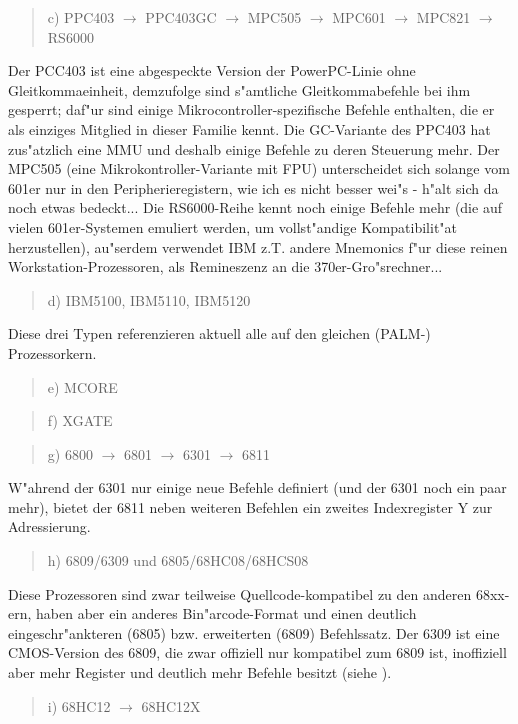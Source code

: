 \documentclass[12pt,a4paper,twoside]{report}
\begin{document}
\begin{quote}
c) PPC403 $\rightarrow$ PPC403GC $\rightarrow$ MPC505 $\rightarrow$ MPC601 $\rightarrow$ MPC821 $\rightarrow$ RS6000
\end{quote}
Der PCC403 ist eine abgespeckte Version der PowerPC-Linie ohne
Gleitkommaeinheit, demzufolge sind s"amtliche Gleitkommabefehle
bei ihm gesperrt; daf"ur sind einige Mikrocontroller-spezifische
Befehle enthalten, die er als einziges Mitglied in dieser Familie
kennt.  Die GC-Variante des PPC403 hat zus"atzlich eine MMU und deshalb
einige Befehle zu deren Steuerung mehr.  Der MPC505 (eine Mikrokontroller-Variante mit FPU)
unterscheidet sich solange vom 601er nur in den Peripherieregistern,
wie ich es nicht besser wei"s - \cite{Mot505} h"alt sich da noch etwas bedeckt...
Die RS6000-Reihe kennt noch einige Befehle mehr (die auf vielen
601er-Systemen emuliert werden, um vollst"andige Kompatibilit"at
herzustellen), au"serdem verwendet IBM z.T. andere Mnemonics f"ur
diese reinen Workstation-Prozessoren, als Remineszenz an die
370er-Gro"srechner...
\begin{quote}
d) IBM5100, IBM5110, IBM5120
\end{quote}
Diese drei Typen referenzieren aktuell alle auf den gleichen (PALM-)
Prozessorkern.
\begin{quote}
e) MCORE
\end{quote}
\begin{quote}
f) XGATE
\end{quote}
\begin{quote}
g) 6800 $\rightarrow$ 6801 $\rightarrow$ 6301 $\rightarrow$ 6811
\end{quote}
W"ahrend der 6301 nur einige neue Befehle definiert (und der 6301
noch ein paar mehr), bietet der 6811 neben weiteren Befehlen ein
zweites Indexregister Y zur Adressierung.
\begin{quote}
h) 6809/6309 und 6805/68HC08/68HCS08
\end{quote}
Diese Prozessoren sind zwar teilweise Quellcode-kompatibel zu den
anderen 68xx-ern, haben aber ein anderes Bin"arcode-Format und einen
deutlich eingeschr"ankteren (6805) bzw. erweiterten (6809) Befehlssatz.
Der 6309 ist eine CMOS-Version des 6809, die zwar offiziell
nur kompatibel zum 6809 ist, inoffiziell aber mehr Register und
deutlich mehr Befehle besitzt (siehe \cite{Kaku}).
\begin{quote}
i) 68HC12 $\longrightarrow$ 68HC12X
\end{quote}
\end{document}
